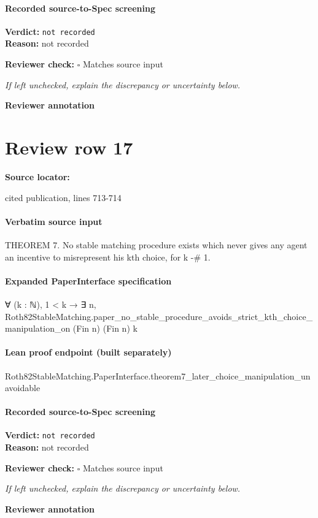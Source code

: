 \documentclass[10pt]{article}
\newcommand{\reviewerbox}{%
  \par\noindent\fbox{\parbox{0.96\linewidth}{\rule{0pt}{0.38in}}}\par
}
\newcommand{\reviewmatch}[1]{%
  \par\noindent\textbf{Reviewer check:} $\square$\; #1\par
  \noindent\emph{If left unchecked, explain the discrepancy or uncertainty below.}\par
}
\begin{document}
\paragraph{Recorded source-to-Spec screening}
\textbf{Verdict:} \texttt{not recorded}
\\
\textbf{Reason:} not recorded
\reviewmatch{Matches source input}
\noindent\textbf{Reviewer annotation}\par
\reviewerbox
\clearpage
\hypertarget{source-claim-775470afdcdc7bf3}{}
\section*{Review row 17}
\textbf{Source locator:} {\footnotesize\raggedright cited publication, lines 713-\allowbreak{}714\par}
\paragraph{Verbatim source input}
\begin{ReviewVerbatim}
THEOREM 7. No stable matching procedure exists which never gives any agent an
incentive to misrepresent his kth choice, for k -# 1.
\end{ReviewVerbatim}


\paragraph{Expanded PaperInterface specification}
\begin{ReviewVerbatim}
∀ (k : ℕ),
  1 < k → ∃ n, Roth82StableMatching.paper_no_stable_procedure_avoids_strict_kth_choice_manipulation_on (Fin n) (Fin n) k
\end{ReviewVerbatim}

\paragraph{Lean proof endpoint (built separately)}\begin{ReviewVerbatim}
Roth82StableMatching.PaperInterface.theorem7_later_choice_manipulation_unavoidable
\end{ReviewVerbatim}

\paragraph{Recorded source-to-Spec screening}
\textbf{Verdict:} \texttt{not recorded}
\\
\textbf{Reason:} not recorded
\reviewmatch{Matches source input}
\noindent\textbf{Reviewer annotation}\par
\reviewerbox
\clearpage
\hypertarget{source-claim-f143def46edc881e}{}
\end{document}
